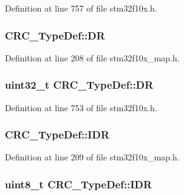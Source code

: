 Definition at line 757 of file stm32f10x.\+h.

\subsubsection[{\texorpdfstring{DR}{DR}}]{ C\+R\+C\+\_\+\+Type\+Def\+::\+DR}\hypertarget{struct_c_r_c___type_def_abdd093b4ff1167510b937f99c0f7430c}{}\label{struct_c_r_c___type_def_abdd093b4ff1167510b937f99c0f7430c}


Definition at line 208 of file stm32f10x\+\_\+map.\+h.

\subsubsection[{\texorpdfstring{DR}{DR}}]{ {\bf uint32\+\_\+t} C\+R\+C\+\_\+\+Type\+Def\+::\+DR}\hypertarget{struct_c_r_c___type_def_a50cb22870dbb9001241cec694994e5ef}{}\label{struct_c_r_c___type_def_a50cb22870dbb9001241cec694994e5ef}


Definition at line 753 of file stm32f10x.\+h.

\subsubsection[{\texorpdfstring{I\+DR}{IDR}}]{ C\+R\+C\+\_\+\+Type\+Def\+::\+I\+DR}\hypertarget{struct_c_r_c___type_def_aa16b8e86f6f245979a778a7797da8d97}{}\label{struct_c_r_c___type_def_aa16b8e86f6f245979a778a7797da8d97}


Definition at line 209 of file stm32f10x\+\_\+map.\+h.

\subsubsection[{\texorpdfstring{I\+DR}{IDR}}]{ {\bf uint8\+\_\+t} C\+R\+C\+\_\+\+Type\+Def\+::\+I\+DR}\hypertarget{struct_c_r_c___type_def_ad84e8694cd4b5375ee533c2d875c3b5a}{}\label{struct_c_r_c___type_def_ad84e8694cd4b5375ee533c2d875c3b5a}


